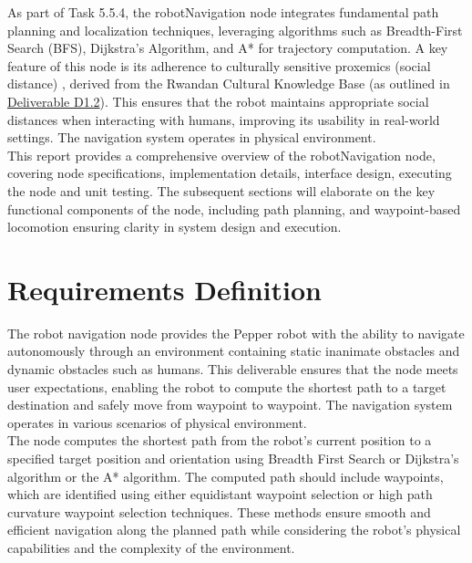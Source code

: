 \documentclass{CSSRforAfrica}
\begin{document}
\noindent As part of Task 5.5.4, the robotNavigation node integrates fundamental path planning and localization techniques, leveraging algorithms such as Breadth-First Search (BFS), Dijkstra’s Algorithm, and A* for trajectory computation. A key feature of this node is its adherence to culturally sensitive proxemics (social distance) , derived from the Rwandan Cultural Knowledge Base (as outlined in \href{https://cssr4africa.github.io/deliverables/CSSR4Africa_Deliverable_D1.2.pdf}{Deliverable D1.2}). This ensures that the robot maintains appropriate social distances when interacting with humans, improving its usability in real-world settings. The navigation system operates in physical environment.\\

\noindent This report provides a comprehensive overview of the robotNavigation node, covering node specifications, implementation details, interface design, executing the node and unit testing. The subsequent sections will elaborate on the key functional components of the node, including path planning, and waypoint-based locomotion ensuring clarity in system design and execution.

\newpage

\section{Requirements Definition}
The robot navigation node provides the Pepper robot with the ability to navigate autonomously through an environment containing static inanimate obstacles and dynamic obstacles such as humans. This deliverable ensures that the node meets user expectations, enabling the robot to compute the shortest path to a target destination and safely move from waypoint to waypoint. The navigation system operates in various scenarios of physical environment. \\

\noindent The node computes the shortest path from the robot's current position to a specified target position and orientation using Breadth First Search or Dijkstra’s algorithm or the A* algorithm. The computed path should include waypoints, which are identified using either equidistant waypoint selection or high path curvature waypoint selection techniques. These methods ensure smooth and efficient navigation along the planned path while considering the robot’s physical capabilities and the complexity of the environment.\\
\end{document}
